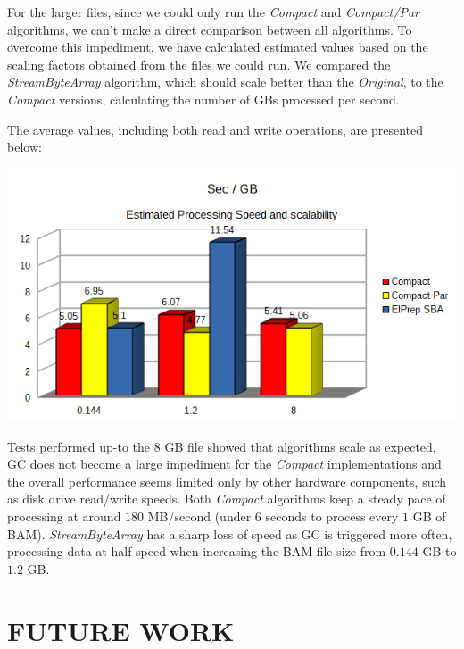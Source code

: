 \documentclass[a4paper,twoside]{article}
\begin{document}
{For the larger files, since we could only run the \textit{Compact} and \textit{Compact/Par} algorithms, we can't make a direct comparison between all algorithms. To overcome this impediment, we have calculated estimated values based on the scaling factors obtained from the files we could run.
We compared the \textit{StreamByteArray} algorithm, which should scale better than the \textit{Original}, to the \textit{Compact} versions, calculating the number of GBs processed per second.

The average values, including both read and write operations, are presented below:

\begin{center}
	\includegraphics[scale=0.5]{images/seconds_per_gb_ryzen.png}
\end{center}

Tests performed up-to the $8$ GB file showed that algorithms scale as expected, GC does not become a large impediment for the \textit{Compact} implementations and the overall performance seems limited only by other hardware components, such as disk drive read/write speeds.
Both \textit{Compact} algorithms keep a steady pace of processing at around $180$ MB/second (under $6$ seconds to process every $1$ GB of BAM). \textit{StreamByteArray} has a sharp loss of speed as GC is triggered more often, processing data at half speed when increasing the BAM file size from $0.144$ GB to $1.2$ GB.









\section{\uppercase{Future work}}
\label{sec:future}

}
\end{document}
